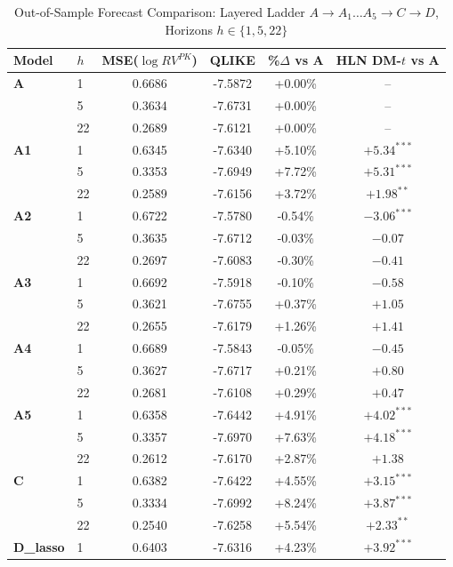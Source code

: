 
\begin{table}[htbp]
\centering
\caption{Out-of-Sample Forecast Comparison: Layered Ladder $A \to A_1\dots A_5 \to C \to D$, Horizons $h \in \{1,5,22\}$}
\label{tab:model_comparison}
\small
\begin{tabular}{llcccc}
\toprule
Model & $h$ & MSE($\log RV^{PK}$) & QLIKE & \%$\Delta$ vs A & HLN DM-$t$ vs A \\
\midrule
\textbf{A} &  1 & 0.6686 & -7.5872 & +0.00\% & -- \\
 &  5 & 0.3634 & -7.6731 & +0.00\% & -- \\
 & 22 & 0.2689 & -7.6121 & +0.00\% & -- \\
\midrule
\textbf{A1} &  1 & 0.6345 & -7.6340 & +5.10\% & $+5.34^{***}$ \\
 &  5 & 0.3353 & -7.6949 & +7.72\% & $+5.31^{***}$ \\
 & 22 & 0.2589 & -7.6156 & +3.72\% & $+1.98^{**}$ \\
\midrule
\textbf{A2} &  1 & 0.6722 & -7.5780 & -0.54\% & $-3.06^{***}$ \\
 &  5 & 0.3635 & -7.6712 & -0.03\% & $-0.07$ \\
 & 22 & 0.2697 & -7.6083 & -0.30\% & $-0.41$ \\
\midrule
\textbf{A3} &  1 & 0.6692 & -7.5918 & -0.10\% & $-0.58$ \\
 &  5 & 0.3621 & -7.6755 & +0.37\% & $+1.05$ \\
 & 22 & 0.2655 & -7.6179 & +1.26\% & $+1.41$ \\
\midrule
\textbf{A4} &  1 & 0.6689 & -7.5843 & -0.05\% & $-0.45$ \\
 &  5 & 0.3627 & -7.6717 & +0.21\% & $+0.80$ \\
 & 22 & 0.2681 & -7.6108 & +0.29\% & $+0.47$ \\
\midrule
\textbf{A5} &  1 & 0.6358 & -7.6442 & +4.91\% & $+4.02^{***}$ \\
 &  5 & 0.3357 & -7.6970 & +7.63\% & $+4.18^{***}$ \\
 & 22 & 0.2612 & -7.6170 & +2.87\% & $+1.38$ \\
\midrule
\textbf{C} &  1 & 0.6382 & -7.6422 & +4.55\% & $+3.15^{***}$ \\
 &  5 & 0.3334 & -7.6992 & +8.24\% & $+3.87^{***}$ \\
 & 22 & 0.2540 & -7.6258 & +5.54\% & $+2.33^{**}$ \\
\midrule
\textbf{D\_lasso} &  1 & 0.6403 & -7.6316 & +4.23\% & $+3.92^{***}$ \\

\end{tabular}
\end{table}
